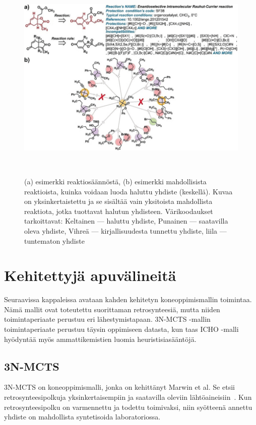 \documentclass[finnish,twoside,censored,tkt,sw-line]{HYthesisML}
\begin{document}
\begin{figure}[ht]
    \centering
    \includegraphics[width=\textwidth]{retrosynthesis.jpg}
    \caption{(a) esimerkki reaktiosäännöstä, (b) esimerkki mahdollisista reaktioista, kuinka voidaan luoda haluttu yhdiste (keskellä).
        Kuvaa on yksinkertaistettu ja se sisältää vain yksitoista mahdollista reaktiota, jotka tuottavat halutun yhdisteen.
        Värikoodaukset tarkoittavat: Keltainen --- haluttu yhdiste, Punainen --- saatavilla oleva yhdiste, Vihreä --- kirjallisuudesta tunnettu yhdiste, liila --- tuntematon yhdiste}
    {~\cite{ExpertKnowledgeRetorsynthesis}}
\end{figure}

\section{Kehitettyjä apuvälineitä}

Seuraavissa kappaleissa avataan kahden kehitetyn koneoppimismallin toimintaa.
Nämä mallit ovat toteutettu suorittaman retrosynteesiä, mutta niiden toimintaperiaate perustuu eri lähestymistapaan.
3N-MCTS -mallin toimintaperiaate perustuu täysin oppimiseen datasta, kun taas ICHO -malli hyödyntää myös ammattikemistien luomia heuristisiasääntöjä.

\subsection{3N-MCTS}

3N-MCTS on koneoppimismalli, jonka on kehittänyt Marwin et al.
Se etsii retrosynteesipolkuja yksinkertaisempiin ja saatavilla oleviin lähtöaineisiin~\cite{SeglerMarwinHS2018Pcsw}.
Kun retrosynteesipolku on varmennettu ja todettu toimivaksi, niin syötteenä annettu yhdiste on mahdollista syntetisoida laboratoriossa.
\end{document}
